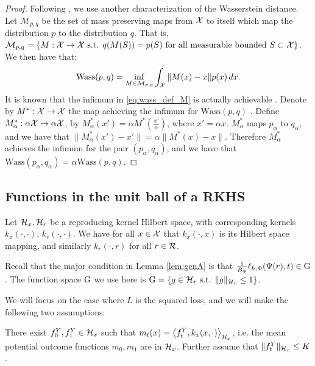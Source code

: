 \begin{proof}
Following \cite{villani2008optimal,tabak2016preconditioning}, we use another characterization of the Wasserstein  distance. Let $\mathcal{M}_{p,q}$ be the set of mass preserving maps from $\mathcal X$ to itself which map the distribution $p$ to the distribution $q$. That is,  $\mathcal{M}_{p,q} = \{M : \mathcal X \rightarrow \mathcal X \text{ s.t. }q(M(S)) = p(S) \text{ for all measurable bounded } S \subset \mathcal X\}$. We then have that:
\begin{equation}\label{eq:wass_def_M}
\text{Wass}(p,q) = \inf_{M \in \mathcal{M}_{p,q}} \int_\mathcal X \|M(x) - x \| p(x) \, dx .
\end{equation}
It is known that the infimum in \eqref{eq:wass_def_M} is actually achievable \citep[Theorem 5.2]{villani2008optimal}. Denote by $M^*: \mathcal X \rightarrow \mathcal X$ the map achieving the infimum for $\text{Wass}(p,q)$ . Define $M^*_\alpha :\alpha \mathcal X \rightarrow \alpha \mathcal X$, by $M^*_\alpha(x') = \alpha M^*(\frac{x'}{\alpha})$, where $x' = \alpha x$.  $M^*_\alpha$ maps $p_\alpha$ to $q_\alpha$, and we have that $\|M^*_\alpha(x') - x'\| = \alpha \|M^*(x)-x\|$. Therefore $M^*_\alpha$ achieves the infimum for the pair $(p_\alpha,q_\alpha)$, and we have that $\text{Wass}\left(p_{\alpha  },q_{\alpha  }\right) = \alpha\text{Wass}\left(p,q\right)$.
\end{proof}

\subsection{Functions in the unit ball of a RKHS}\label{subsec:mmd}

Let $\mathcal H_x, \mathcal H_r$ be a reproducing kernel Hilbert space, with corresponding kernels $k_x(\cdot,\cdot)$, $k_r(\cdot,\cdot)$. We have for all $x \in \mathcal X$ that  $k_x(\cdot,x)$ is its Hilbert space mapping, and similarly $k_r(\cdot,r)$ for all $r \in \mathcal{R}$.

Recall that the major condition in Lemma \ref{lem:genA} is that $\frac{1}{B_\Phi} \ell_{h,\Phi}(\Psi(r),t) \in \mathrm{G}$. The function space $\mathrm{G}$ we use here is $\mathrm{G} = \{ g\in \mathcal H_r \text{ s.t. } \|g\|_{\mathcal H_r} \leq 1\}$.

We will focus on the case where $L$ is the squared loss, and we will make the following two assumptions:

\begin{thmappasmp}\label{asmp:yinrkhs}
There exist $f^Y_0,f^Y_1 \in \mathcal H_x$ such that $m_t(x) = \left<f^Y_t,k_x(x,\cdot)\right>_{\mathcal H_x}$, i.e.
the mean potential outcome functions $m_0,m_1$ are in $\mathcal H_x$.   Further assume that $\|f^Y_t\|_{\mathcal H_x} \leq K$.
\end{thmappasmp}


